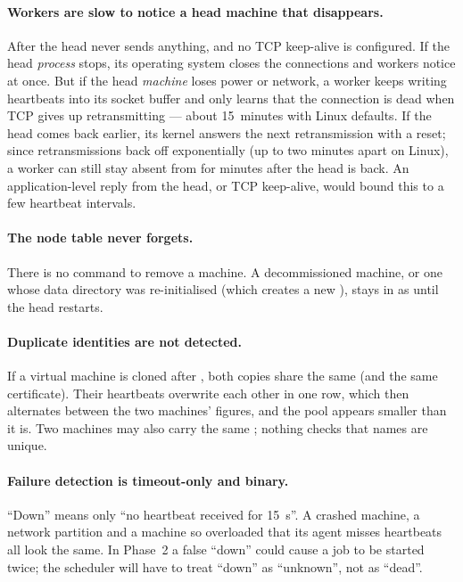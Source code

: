 \documentclass{article}
\begin{document}
\paragraph{Workers are slow to notice a head machine that disappears.}
After  the head never sends anything, and no TCP
keep-alive is configured. If the head \emph{process} stops, its operating
system closes the connections and workers notice at once. But if the
head \emph{machine} loses power or network, a worker keeps writing
heartbeats into its socket buffer and only learns that the connection is
dead when TCP gives up retransmitting --- about 15~minutes with Linux
defaults. If the head comes back earlier, its kernel answers the next
retransmission with a reset; since retransmissions back off exponentially
(up to two minutes apart on Linux), a worker can still stay absent from
 for minutes after the head is back. An application-level
reply from the head, or TCP keep-alive, would bound this to a few
heartbeat intervals.

\paragraph{The node table never forgets.}
There is no command to remove a machine. A decommissioned machine, or one
whose data directory was re-initialised (which creates a new
), stays in  as  until the head
restarts.

\paragraph{Duplicate identities are not detected.}
If a virtual machine is cloned after , both copies share the
same  (and the same certificate). Their heartbeats
overwrite each other in one row, which then alternates between the two
machines' figures, and the pool appears smaller than it is. Two machines
may also carry the same ; nothing checks that names are
unique.

\paragraph{Failure detection is timeout-only and binary.}
``Down'' means only ``no heartbeat received for 15~s''. A crashed
machine, a network partition and a machine so overloaded that its agent
misses heartbeats all look the same. In Phase~2 a false ``down'' could
cause a job to be started twice; the scheduler will have to treat ``down''
as ``unknown'', not as ``dead''.
\end{document}
